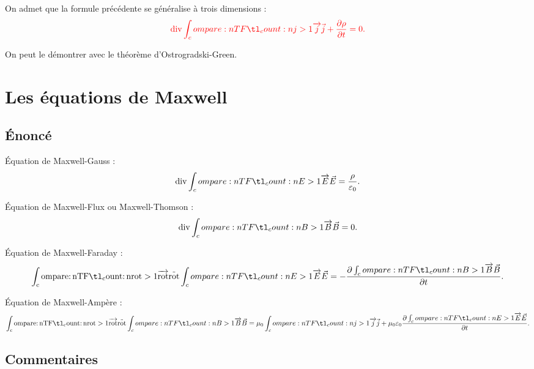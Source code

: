 On admet que la formule précédente se généralise à trois dimensions : \[\color{red}\div\v{j}+\pdv{\rho}{t}=0.\color{black}\]

On peut le démontrer avec le théorème d'Ostrogradski-Green.

\section{Les équations de Maxwell}

\subsection{Énoncé}

Équation de Maxwell-Gauss \MG : \[\div\v{E}=\dfrac{\rho}{\epsilon_0}.\]

Équation de Maxwell-Flux ou Maxwell-Thomson \MT : \[\div\v{B}=0.\]

Équation de Maxwell-Faraday \MF : \[\rot\v{E}=-\pdv{\v{B}}{t}.\]

Équation de Maxwell-Ampère \MA : \[\rot\v{B}=\mu_0\v{j}+\mu_0\epsilon_0\pdv{\v{E}}{t}.\]

\subsection{Commentaires}

